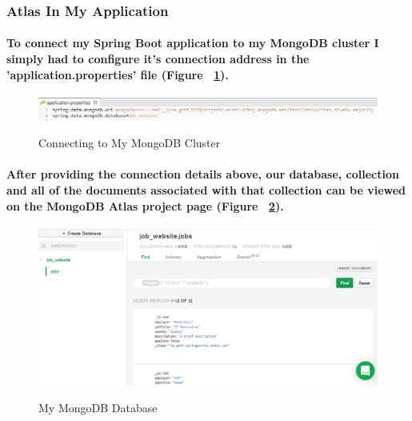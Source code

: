 \subsubsection{Atlas In My Application}
\paragraph{To connect my Spring Boot application to my MongoDB cluster I simply had to configure it's connection address in the 'application.properties' file (Figure ~\ref{mongo5_label}). }
\begin{figure}[ht]
    \centering
    \includegraphics[scale=0.515]{Images/mongo5.png} 
    \label{mongo5_label}
    \caption{Connecting to My MongoDB Cluster}
\end{figure}
\paragraph{After providing the connection details above, our database, collection and all of the documents associated with that collection can be viewed on the MongoDB Atlas project page (Figure ~\ref{mongo1_label}).}
\begin{figure}[ht]
    \centering
    \includegraphics[scale=0.4]{Images/mongo1.png} 
    \label{mongo1_label}
    \caption{My MongoDB Database}
\end{figure}

\section{}
